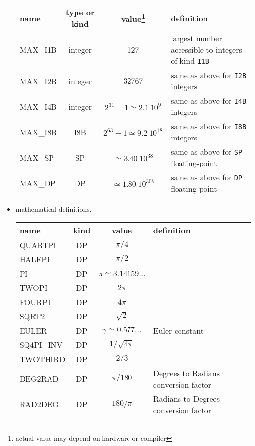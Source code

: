 \begin{itemize}
\begin{mytable}{%
\begin{tabularx}{\linewidth}{lcc X}
name & type or kind & value\footnote{\label{fn:healpix_types:max}actual value may depend on hardware or compiler} & definition \\
\hline
MAX\_I1B & integer & 127 & largest number accessible to integers of kind {\tt I1B}\\
MAX\_I2B & integer & $32767$ &
same as above for {\tt I2B} integers\\
MAX\_I4B & integer & $2^{31}-1 \simeq 2.1\ 10^9$& same as above for {\tt I4B} integers \\
MAX\_I8B & I8B & $2^{63}-1 \simeq 9.2\ 10^{18}$& same as above for {\tt I8B} integers \\
MAX\_SP & SP & $\simeq 3.40\ 10^{38}$ & same as above for {\tt SP} floating-point\\
MAX\_DP & DP & $\simeq 1.80\ 10^{308}$ & same as above for {\tt DP} floating-point\\
\hline
\end{tabularx}
}
\end{mytable}

\item
mathematical definitions,%
%

\begin{mytable}{%
\begin{tabularx}{\linewidth}{lcc X}
name & kind & value & definition \\
\hline
QUARTPI & DP & $\pi/4$ & \\
HALFPI & DP & $\pi/2$ & \\
PI & DP & $\pi \simeq 3.14159\ldots$ & \\
TWOPI & DP & $2\pi$ & \\
FOURPI & DP & $4\pi$ & \\
SQRT2 & DP & $\sqrt{2}$ & \\
EULER & DP & $\gamma \simeq 0.577\ldots$ & Euler constant \\
SQ4PI\_INV & DP & $1/\sqrt{4\pi}$ & \\
TWOTHIRD & DP & $2/3$ & \\
DEG2RAD & DP & $\pi/180$ & Degrees to Radians conversion factor\\
RAD2DEG & DP & $180/\pi$ & Radians to Degrees conversion factor\\
\hline
\end{tabularx}
}
\end{mytable}


\end{itemize}
